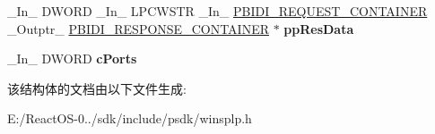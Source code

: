 \begin{DoxyCompactItemize}
\item 
\mbox{\label{struct___m_o_n_i_t_o_r2_a171c6b9f68f70d33e24711d0a88d0058}} 
\+\_\+\+In\+\_\+ D\+W\+O\+RD \+\_\+\+In\+\_\+ L\+P\+C\+W\+S\+TR \+\_\+\+In\+\_\+ \hyperlink{struct___b_i_d_i___r_e_q_u_e_s_t___c_o_n_t_a_i_n_e_r}{P\+B\+I\+D\+I\+\_\+\+R\+E\+Q\+U\+E\+S\+T\+\_\+\+C\+O\+N\+T\+A\+I\+N\+ER} \+\_\+\+Outptr\+\_\+ \hyperlink{struct___b_i_d_i___r_e_s_p_o_n_s_e___c_o_n_t_a_i_n_e_r}{P\+B\+I\+D\+I\+\_\+\+R\+E\+S\+P\+O\+N\+S\+E\+\_\+\+C\+O\+N\+T\+A\+I\+N\+ER} $\ast$ {\bfseries pp\+Res\+Data}
\item 
\mbox{\label{struct___m_o_n_i_t_o_r2_a25b2ab24e4b24d308740616e3668c082}} 
\+\_\+\+In\+\_\+ D\+W\+O\+RD {\bfseries c\+Ports}
\end{DoxyCompactItemize}


该结构体的文档由以下文件生成\+:\begin{DoxyCompactItemize}
\item 
E\+:/\+React\+O\+S-\/0../sdk/include/psdk/winsplp.\+h\end{DoxyCompactItemize}
